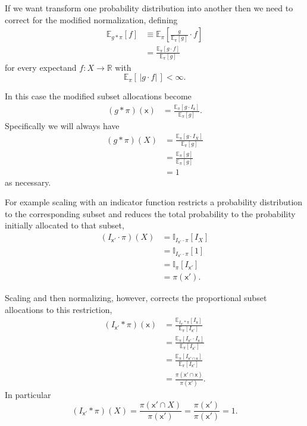 \documentclass[
  letterpaper,
  DIV=11,
  numbers=noendperiod]{scrartcl}
\begin{document}
If we want transform one probability distribution into another then we
need to correct for the modified normalization, defining \begin{align*}
\mathbb{E}_{g \ast \pi} [ f ] 
&\equiv
\mathbb{E}_{\pi} \left[ \frac{g}{ \mathbb{E}_{\pi} [ g ] } \cdot f \right]
\\
&=
\frac{ \mathbb{E}_{\pi} [ g \cdot f ] }{ \mathbb{E}_{\pi} [ g ] }
\end{align*} for every expectand \(f: X \rightarrow \mathbb{R}\) with \[
\mathbb{E}_{\pi} [ \, | g \cdot f | \, ] < \infty.
\]

In this case the modified subset allocations become \begin{align*}
(g \ast \pi)(\mathsf{x})
&=
\frac{ \mathbb{E}_{\pi} [ g \cdot I_{\mathsf{x}} ] }
{ \mathbb{E}_{\pi} [ g ] }.
\end{align*} Specifically we will always have \begin{align*}
(g \ast \pi)(X)
&=
\frac{ \mathbb{E}_{\pi} [ g \cdot I_{X} ] }
{ \mathbb{E}_{\pi} [ g ] }
\\
&=
\frac{ \mathbb{E}_{\pi} [ g ] }
{ \mathbb{E}_{\pi} [ g ] }
\\
&=
1
\end{align*} as necessary.

For example scaling with an indicator function restricts a probability
distribution to the corresponding subset and reduces the total
probability to the probability initially allocated to that subset,
\begin{align*}
(I_{\mathsf{x}'} \cdot \pi)(X)
&=
\mathbb{I}_{I_{\mathsf{x}'} \cdot \pi} [ I_{X} ]
\\
&=
\mathbb{I}_{I_{\mathsf{x}'} \cdot \pi} [ 1 ]
\\
&=
\mathbb{I}_{\pi} [ I_{\mathsf{x}'} ]
\\
&=
\pi(\mathsf{x}').
\end{align*}

Scaling and then normalizing, however, corrects the proportional subset
allocations to this restriction, \begin{align*}
(I_{\mathsf{x}'} \ast \pi)( \mathsf{x} )
&=
\frac{ \mathbb{E}_{I_{\mathsf{x}'} \ast \pi} [ I_{\mathsf{x}} ] }
{ \mathbb{E}_{\pi} [ I_{\mathsf{x}'} ] }
\\
&=
\frac{ \mathbb{E}_{\pi} [ I_{\mathsf{x}'} \cdot I_{\mathsf{x}} ] }
{ \mathbb{E}_{\pi} [ I_{\mathsf{x}'} ] }
\\
&=
\frac{ \mathbb{E}_{\pi} [ I_{\mathsf{x}' \cap \mathsf{x}} ] }
{ \mathbb{E}_{\pi} [ I_{\mathsf{x}'} ] }
\\
&=
\frac{ \pi(\mathsf{x}' \cap \mathsf{x}) }
{ \pi(\mathsf{x}') }.
\end{align*} In particular \[
(I_{\mathsf{x}'} \ast \pi)( X )
=
\frac{ \pi(\mathsf{x}' \cap X) }{ \pi(\mathsf{x}') }
=
\frac{ \pi(\mathsf{x}') }{ \pi(\mathsf{x}') }
=
1.
\]
\end{document}
